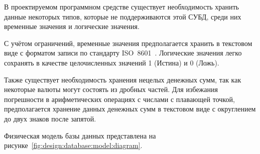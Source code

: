 В проектируемом программном средстве существует необходимость хранить данные некоторых типов, которые не поддерживаются этой СУБД, среди них временные значения и логические значения.

С учётом ограничений, временные значения предполагается хранить в текстовом виде с форматом записи по стандарту ISO~8601~\cite{iso_8601}.
Логические значения легко сохранять в качестве целочисленных значений 1 (Истина) и 0 (Ложь).

Также существует необходимость хранения нецелых денежных сумм, так как некоторые валюты могут состоять из дробных частей.
Для избежания погрешности в арифметических операциях с числами с плавающей точкой, предполагается хранение данных денежных сумм в текстовом виде с округлением до двух знаков после запятой.

Физическая модель базы данных представлена на рисунке~\ref{fig:design:database:model:diagram}.

